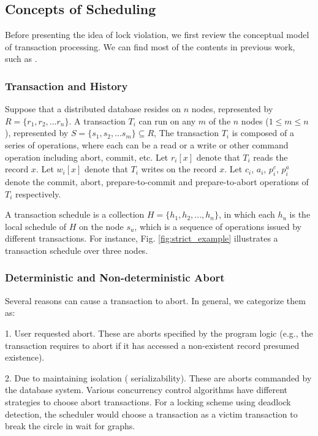 \documentclass[conference]{IEEEtran}
\begin{document}
\subsection{Concepts of Scheduling}
Before presenting the idea of lock violation, we first review the conceptual model of transaction processing. 
We can find most of the contents in previous work, such as \cite{LockNoWait:journals/csur/BernsteinG81}.

\subsubsection{Transaction and History}
Suppose that a distributed database resides on ${n}$ nodes, represented by ${R = \{r_1, r_2, ... r_n\}}$.
A transaction ${T_i}$ can run on any ${m}$ of the ${n}$ nodes ($1 \le m \le n$), represented by  ${S = \{s_1, s_2, ... s_m\} \subseteq R}$,
The transaction ${T_i}$ is composed of a series of operations, 
where each can be a read or a write or other command operation including abort, commit, etc.
Let ${r_i[x]}$ denote that ${T_i}$ reads the record ${x}$. Let ${w_i[x]}$ denote that ${T_i}$ writes on the record ${x}$.
Let ${c_i}$, ${a_i}$, ${p^c_i}$, ${p^a_i}$ denote the commit, abort, prepare-to-commit and prepare-to-abort operations of ${T_i}$ respectively.


A transaction schedule is a collection ${H = \{h_1, h_2, ..., h_n\}}$, in which
each ${h_u}$ is the local schedule of $H$ on the node ${s_u}$, which is a sequence of operations issued by different transactions.
For instance, Fig. \ref{fig:strict_example} illustrates a transaction schedule over three nodes.

\subsubsection{Deterministic and Non-deterministic Abort}
Several reasons can cause a transaction to abort. In general, we categorize them as:

1. User requested abort. 
These are aborts specified by the program logic (e.g., the transaction requires to abort if it has accessed a non-existent record presumed existence).

2. Due to maintaining isolation ( serializability). 
These are aborts commanded by the database system.
Various concurrency control algorithms have different strategies to choose abort transactions.
For a locking scheme using deadlock detection,
the scheduler would choose a transaction as a victim transaction to break the circle in wait for graphs.
\end{document}
